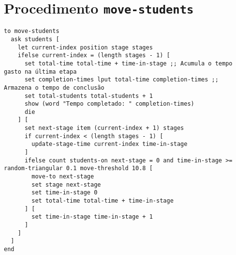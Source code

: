 \documentclass{article}
\begin{document}
\section{Procedimento \texttt{move-students}}

\begin{lstlisting}[language=NetLogo]
to move-students
  ask students [
    let current-index position stage stages
    ifelse current-index = (length stages - 1) [
      set total-time total-time + time-in-stage ;; Acumula o tempo gasto na última etapa
      set completion-times lput total-time completion-times ;; Armazena o tempo de conclusão
      set total-students total-students + 1
      show (word "Tempo completado: " completion-times)
      die
    ] [
      set next-stage item (current-index + 1) stages
      if current-index < (length stages - 1) [
        update-stage-time current-index time-in-stage
      ]
      ifelse count students-on next-stage = 0 and time-in-stage >= random-triangular 0.1 move-threshold 10.8 [
        move-to next-stage
        set stage next-stage
        set time-in-stage 0
        set total-time total-time + time-in-stage
      ] [
        set time-in-stage time-in-stage + 1
      ]
    ]
  ]
end
\end{lstlisting}
\end{document}
